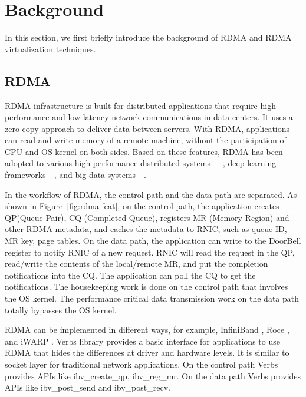 \section{Background}
In this section, we first briefly introduce the background of RDMA and RDMA virtualization techniques.

\subsection{RDMA}
RDMA infrastructure is built for distributed applications that require high-performance and low latency network communications in data centers.
It uses a zero copy approach to deliver data between servers. With RDMA, applications can read and write memory of a remote machine, without the participation of CPU and OS kernel on both sides. Based on these features, RDMA has been adopted to various high-performance distributed systems~\cite{dragojevic2014farm}~\cite{wei2015fast}~\cite{lu2017octopus}, deep learning frameworks~\cite{abadi2016tensorflow}~\cite{chen2015mxnet}, and big data systems~\cite{spark-rdma}~\cite{hadoop-rdma}.

In the workflow of RDMA, the control path and the data path are separated. As shown in Figure~\ref{fig:rdma-feat}, on the control path, the application creates QP(Queue Pair), CQ (Completed Queue), registers MR (Memory Region) and other RDMA metadata, and caches the metadata to RNIC, such as queue ID, MR key, page tables. On the data path, the application can write to  the DoorBell register to notify RNIC of a new request. RNIC will read the request in the QP, read/write the contents of the local/remote MR, and put the completion notifications into the CQ. The application can poll the CQ to get the notifications. The housekeeping work is done on the control path that involves the OS kernel. The performance critical data transmission work on the data path totally bypasses the OS kernel.

RDMA can be implemented in different ways, for example, InfiniBand \cite{infiniband}, Roce \cite{roce}, and iWARP \cite{iwarp}. Verbs library \cite{verbs} provides a basic interface for applications to use RDMA that hides the differences at driver and hardware levels. It is similar to socket layer for traditional network applications. On the control path Verbs provides APIs like ibv\_create\_qp, ibv\_reg\_mr. On the data path Verbs provides APIs like ibv\_post\_send and ibv\_post\_recv.


